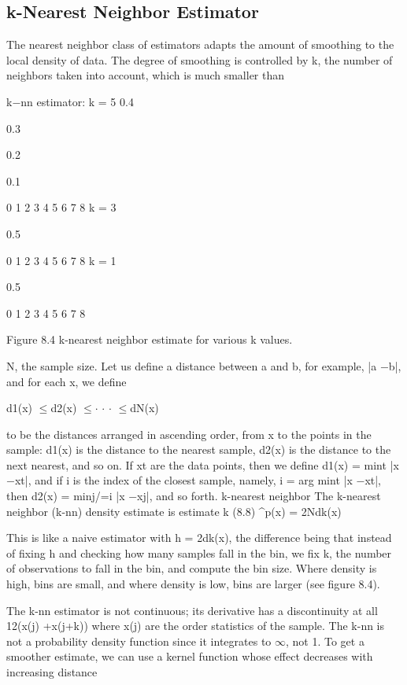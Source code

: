 \subsection{k-Nearest Neighbor Estimator}

The nearest neighbor class of estimators adapts the amount of smoothing to the local density of data. The degree of smoothing is controlled by k, the number of neighbors taken into account, which is much smaller than

k$-$nn estimator: k = 5 0.4

0.3

0.2

0.1

0 1 2 3 4 5 6 7 8 k = 3

0.5

0 1 2 3 4 5 6 7 8 k = 1

0.5

0 1 2 3 4 5 6 7 8

Figure 8.4 k-nearest neighbor estimate for various k values.

N, the sample size. Let us define a distance between a and b, for example, |a $-$b|, and for each x, we define

d1(x) $\leq$d2(x) $\leq$$\cdot$ $\cdot$ $\cdot$ $\leq$dN(x)

to be the distances arranged in ascending order, from x to the points in the sample: d1(x) is the distance to the nearest sample, d2(x) is the distance to the next nearest, and so on. If xt are the data points, then we define d1(x) = mint |x $-$xt|, and if i is the index of the closest sample, namely, i = arg mint |x $-$xt|, then d2(x) = minj/=i |x $-$xj|, and so forth. k-nearest neighbor The k-nearest neighbor (k-nn) density estimate is estimate k (8.8) \textasciicircum{}p(x) = 2Ndk(x)

This is like a naive estimator with h = 2dk(x), the difference being that instead of fixing h and checking how many samples fall in the bin, we fix k, the number of observations to fall in the bin, and compute the bin size. Where density is high, bins are small, and where density is low, bins are larger (see figure 8.4).

The k-nn estimator is not continuous; its derivative has a discontinuity at all 12(x(j) +x(j+k)) where x(j) are the order statistics of the sample. The k-nn is not a probability density function since it integrates to $\infty$, not 1. To get a smoother estimate, we can use a kernel function whose effect decreases with increasing distance

